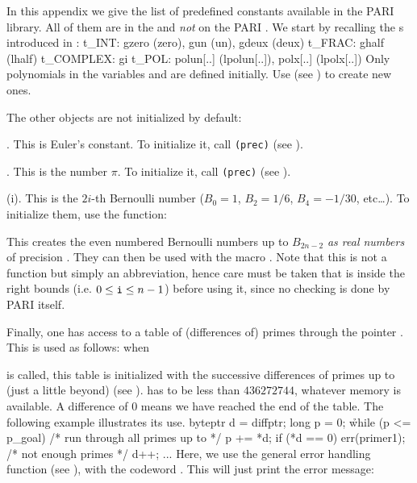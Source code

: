 
In this appendix we give the list of predefined constants available in the
PARI library. All of them are in the  and {\it not\/} on the PARI
. We start by recalling the s introduced in
:
%
\bprog%
t\_INT: gzero (zero), gun (un), gdeux (deux)
t\_FRAC: ghalf (lhalf)
t\_COMPLEX: gi
t\_POL: polun[..] (lpolun[..]), polx[..] (lpolx[..])
\eprog
\noindent Only polynomials in the variables  and  are
defined initially. Use  (see ) to
create new ones.

\noindent The other objects are not initialized by default:

. This is Euler's constant. To initialize it, call
{\tt{}(prec)} (see ).

. This is the number $\pi$. To initialize it, call
{\tt{}(prec)} (see ).

(i). This is the $2i$-th Bernoulli number ($B_0=1$, $B_2=1/6$,
$B_4=-1/30$, etc\dots). To initialize them, use the function:


This creates the even numbered Bernoulli numbers up to $B_{2n-2}$ {\it as
real numbers\/} of precision . They can then be used with the macro
. Note that this is not a function but simply an abbreviation,
hence care must be taken that  is inside the right bounds (i.e. $0\le
{\tt i}\le n-1$) before using it, since no checking is done by PARI itself.

Finally, one has access to a table of (differences of) primes through the
pointer . This is used as follows: when


\noindent is called, this table is initialized with the successive
differences of primes up to (just a little beyond) 
(see ).  has to be less than $436272744$,
whatever memory is available. A
difference of $0$ means we have reached the end of the table. The following
example illustrates its use.
%
\bprog%
byteptr d = diffptr;
long p = 0;
\h
while (p <= p\_goal) /* {\rm run through all primes up to } */
\obr
\q  p += *d;
\q  if (*d == 0) err(primer1); /* {\rm not enough primes} */
\q  d++;
\q  ...
\cbr
\eprog\noindent
Here, we use the general error handling function  (see
), with the codeword . This will just print
the error message:

